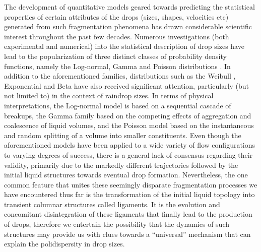 The development of quantitative models geared towards predicting the statistical properties 
of certain attributes of the drops (sizes, shapes, velocities etc) generated from such fragmentation 
phenomena has drawn considerable scientific interest throughout the past few decades.
Numerous investigations (both experimental and numerical) into the statistical description of drop sizes
have lead to the popularization of three distinct classes of probability density functions, 
namely the Log-normal, Gamma and Poisson distributions \cite{vill_1}.
In addition to the aforementioned families, distributions such as the Weibull \cite{weibull}, 
Exponential \cite{exponential} and Beta \cite{beta} have also received significant attention, 
particularly (but not limited to) in the context of raindrop sizes. 
In terms of physical interpretations, the Log-normal model \cite{log_normal} is based on a sequential cascade
of breakups, the Gamma family \cite{vill_2} based on the competing effects of aggregation and coalescence of liquid volumes, 
and the Poisson model \cite{poisson} based on the instantaneous and random splitting of a volume into smaller constituents.  
Even though the aforementioned models have been applied to a wide variety of flow configurations
to varying degrees of success, there is a general lack of consensus regarding their validity, primarily 
due to the markedly different trajectories  
followed by the initial liquid structures towards eventual drop formation. 
Nevertheless, the one common feature that unites these seemingly disparate 
fragmentation processes we have encountered thus far is the transformation 
of the initial liquid topology into transient columnar structures called ligaments. 
It is the evolution and concomitant disintegration of these ligaments 
that finally lead to the production of drops, therefore we entertain 
the possibility that the dynamics of such structures may provide us with clues 
towards a ``universal'' mechanism that can explain the polidispersity in drop sizes. 

